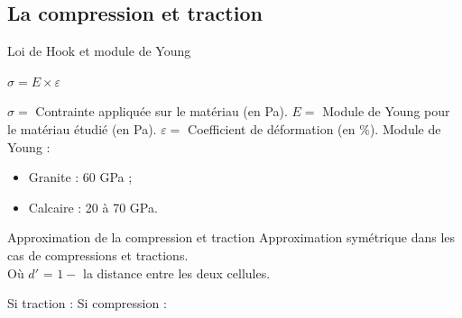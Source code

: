 \documentclass{beamer}
\begin{document}
\subsection{La compression et traction}
\begin{frame}{Loi de Hook et module de Young}
  \begin{center}
    $\sigma = E \times \varepsilon$
  \end{center}
  $\sigma = $ Contrainte appliquée sur le matériau (en Pa). $E = $ Module de Young pour le matériau étudié (en Pa). $\varepsilon = $ Coefficient de déformation (en $\%$). \smallbreak
  Module de Young :
  \begin{itemize}
    \item Granite : 60 GPa ;
    \item Calcaire : 20 à 70 GPa.
  \end{itemize}
\end{frame}

\begin{frame}{Approximation de la compression et traction}
  Approximation symétrique dans les cas de compressions et tractions. \\
  Où $d'$ = $1 -$ la distance entre les deux cellules. \\
  \begin{center}
    Si traction : \medbreak
     \medbreak
    Si compression : \medbreak
  \end{center}
\end{frame}
\end{document}
